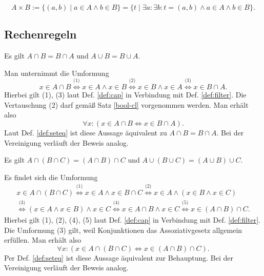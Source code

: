 \begin{Definition}%
\label{def:cart}
\[A\times B := \{(a,b)\mid a\in A\land b\in B\}
= \{t\mid\exists a\colon\exists b\colon t=(a,b)\land a\in A\land b\in B\}.\]
\end{Definition}

\subsection{Rechenregeln}

\begin{Satz}[Kommutativgesetze]
Es gilt $A\cap B = B\cap A$ und $A\cup B = B\cup A$.
\end{Satz}

\begin{Beweis}
Man unternimmt die Umformung
\[x\in A\cap B
\stackrel{\text{(1)}}{\iff} x\in A\land x\in B
\stackrel{\text{(2)}}{\iff} x\in B\land x\in A
\stackrel{\text{(3)}}{\iff} x\in B\cap A.\]
Hierbei gilt (1), (3) laut Def. \ref{def:cap} in Verbindung mit
Def. \ref{def:filter}. Die Vertauschung (2) darf gemäß Satz \ref{bool-cl}
vorgenommen werden. Man erhält also
\[\forall x\colon (x\in A\cap B \iff x\in B\cap A).\]
Laut Def. \ref{def:seteq} ist diese Aussage äquivalent zu
$A\cap B = B\cap A$.
Bei der Vereinigung verläuft der Beweis analog.\,\qedsymbol
\end{Beweis}

\begin{Satz}[Assoziativgesetze]%
\newlinefirst
Es gilt $A\cap (B\cap C) = (A\cap B)\cap C$
und $A\cup (B\cup C) = (A\cup B)\cup C$.
\end{Satz}

\begin{Beweis}
Es findet sich die Umformung
\begin{gather*}
x\in A\cap (B\cap C)
\stackrel{\text{(1)}}\iff x\in A\land x\in B\cap C
\stackrel{\text{(2)}}\iff x\in A\land (x\in B\land x\in C)\\
\stackrel{\text{(3)}}\iff (x\in A\land x\in B)\land x\in C
\stackrel{\text{(4)}}\iff x\in A\cap B\land x\in C
\stackrel{\text{(5)}}\iff x\in (A\cap B)\cap C.
\end{gather*}
Hierbei gilt (1), (2), (4), (5) laut Def. \ref{def:cap} in Verbindung
mit Def. \ref{def:filter}. Die Umformung (3) gilt, weil Konjunktionen
das Assoziativgesetz allgemein erfüllen. Man erhält also
\[\forall x\colon (x\in A\cap (B\cap C) \iff x\in (A\cap B)\cap C).\]
Per Def. \ref{def:seteq} ist diese Aussage äquivalent zur
Behauptung. Bei der Vereinigung verläuft der Beweis analog.\,\qedsymbol
\end{Beweis}

